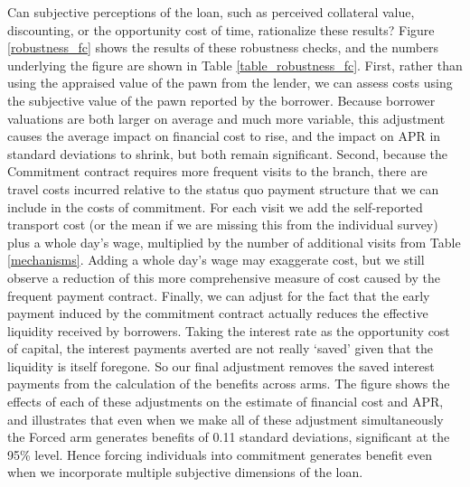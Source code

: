 \documentclass[oneside,11pt]{article}
\begin{document}
Can subjective perceptions of the loan, such as perceived collateral value, discounting, or the opportunity cost of time, rationalize these results?  Figure \ref{robustness_fc} shows the results of these robustness checks, and the numbers underlying the figure are shown in Table \ref{table_robustness_fc}.  First, rather than using the appraised value of the pawn from the lender, we can assess costs using the subjective value of the pawn reported by the borrower.  Because borrower valuations are both larger on average and much more variable, this adjustment causes the average impact on financial cost to rise, and the impact on APR in standard deviations to shrink, but both remain significant.   Second, because the Commitment contract requires more frequent visits to the branch, there are travel costs incurred relative to the status quo payment structure that we can include in the costs of commitment.  For each visit we add the self-reported transport cost (or the mean if we are missing this from the individual survey) plus a whole day's wage, multiplied by the number of additional visits from Table \ref{mechanisms}. Adding a whole day's wage may exaggerate cost, but we still observe a reduction of this more comprehensive measure of cost caused by the frequent payment contract. Finally, we can adjust for the fact that the early payment induced by the commitment contract actually reduces the effective liquidity received by borrowers.  Taking the interest rate as the opportunity cost of capital, the interest payments averted are not really `saved' given that the liquidity is itself foregone.  So our final adjustment removes the saved interest payments from the calculation of the benefits across arms.  The figure shows the effects of each of these adjustments on the estimate of financial cost and APR, and illustrates that even when we make all of these adjustment simultaneously the Forced arm generates benefits of 0.11 standard deviations, significant at the 95\% level.  Hence forcing individuals into commitment generates benefit even when we incorporate multiple subjective dimensions of the loan.
\end{document}
